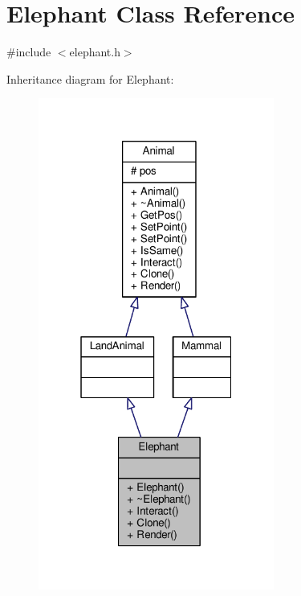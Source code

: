 \hypertarget{classElephant}{}\section{Elephant Class Reference}
\label{classElephant}


{\ttfamily \#include $<$elephant.\+h$>$}



Inheritance diagram for Elephant\+:
\nopagebreak
\begin{figure}[H]
\begin{center}
\leavevmode
\includegraphics[width=220pt]{classElephant__inherit__graph}
\end{center}
\end{figure}


